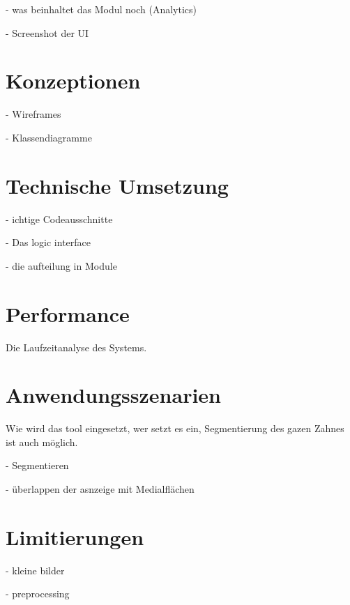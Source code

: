 - was beinhaltet das Modul noch (Analytics)

- Screenshot der UI


\section{Konzeptionen}
- Wireframes

- Klassendiagramme

\section{Technische Umsetzung}
- ichtige Codeausschnitte

- Das logic interface

- die aufteilung in Module

\section{Performance}
Die Laufzeitanalyse des Systems.

\section{Anwendungsszenarien}
Wie wird das tool eingesetzt, wer setzt es ein, Segmentierung des gazen Zahnes ist
auch möglich.

- Segmentieren

- überlappen der asnzeige mit Medialflächen


\section{Limitierungen}

- kleine bilder

- preprocessing
